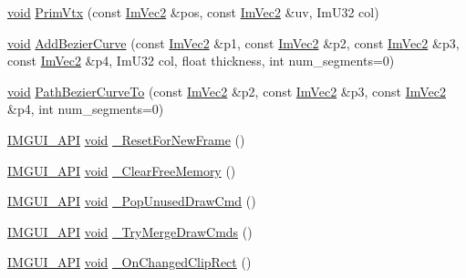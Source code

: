 \begin{DoxyCompactItemize}
\item 
\hyperlink{imgui__impl__opengl3__loader_8h_ac668e7cffd9e2e9cfee428b9b2f34fa7}{void} \hyperlink{structImDrawList_a405377158f0028ad8b4fb6509eef4532}{Prim\+Vtx} (const \hyperlink{structImVec2}{Im\+Vec2} \&pos, const \hyperlink{structImVec2}{Im\+Vec2} \&uv, Im\+U32 col)
\item 
\hyperlink{imgui__impl__opengl3__loader_8h_ac668e7cffd9e2e9cfee428b9b2f34fa7}{void} \hyperlink{structImDrawList_ab815c52f29fa5579bad8142ae2e89ced}{Add\+Bezier\+Curve} (const \hyperlink{structImVec2}{Im\+Vec2} \&p1, const \hyperlink{structImVec2}{Im\+Vec2} \&p2, const \hyperlink{structImVec2}{Im\+Vec2} \&p3, const \hyperlink{structImVec2}{Im\+Vec2} \&p4, Im\+U32 col, float thickness, int num\+\_\+segments=0)
\item 
\hyperlink{imgui__impl__opengl3__loader_8h_ac668e7cffd9e2e9cfee428b9b2f34fa7}{void} \hyperlink{structImDrawList_a9a9dc4a62a26718014e9dc67f40a19e3}{Path\+Bezier\+Curve\+To} (const \hyperlink{structImVec2}{Im\+Vec2} \&p2, const \hyperlink{structImVec2}{Im\+Vec2} \&p3, const \hyperlink{structImVec2}{Im\+Vec2} \&p4, int num\+\_\+segments=0)
\item 
\hyperlink{imgui_8h_a43829975e84e45d1149597467a14bbf5}{I\+M\+G\+U\+I\+\_\+\+A\+PI} \hyperlink{imgui__impl__opengl3__loader_8h_ac668e7cffd9e2e9cfee428b9b2f34fa7}{void} \hyperlink{structImDrawList_a5f78fe195b2507e5926560f591141ff3}{\+\_\+\+Reset\+For\+New\+Frame} ()
\item 
\hyperlink{imgui_8h_a43829975e84e45d1149597467a14bbf5}{I\+M\+G\+U\+I\+\_\+\+A\+PI} \hyperlink{imgui__impl__opengl3__loader_8h_ac668e7cffd9e2e9cfee428b9b2f34fa7}{void} \hyperlink{structImDrawList_a61a886a16655c810e04c0ccebb228f9a}{\+\_\+\+Clear\+Free\+Memory} ()
\item 
\hyperlink{imgui_8h_a43829975e84e45d1149597467a14bbf5}{I\+M\+G\+U\+I\+\_\+\+A\+PI} \hyperlink{imgui__impl__opengl3__loader_8h_ac668e7cffd9e2e9cfee428b9b2f34fa7}{void} \hyperlink{structImDrawList_a2cb0295fcd3062bfedbebbad55865455}{\+\_\+\+Pop\+Unused\+Draw\+Cmd} ()
\item 
\hyperlink{imgui_8h_a43829975e84e45d1149597467a14bbf5}{I\+M\+G\+U\+I\+\_\+\+A\+PI} \hyperlink{imgui__impl__opengl3__loader_8h_ac668e7cffd9e2e9cfee428b9b2f34fa7}{void} \hyperlink{structImDrawList_abdba85bbdc26a98eac56ed04683d5fc7}{\+\_\+\+Try\+Merge\+Draw\+Cmds} ()
\item 
\hyperlink{imgui_8h_a43829975e84e45d1149597467a14bbf5}{I\+M\+G\+U\+I\+\_\+\+A\+PI} \hyperlink{imgui__impl__opengl3__loader_8h_ac668e7cffd9e2e9cfee428b9b2f34fa7}{void} \hyperlink{structImDrawList_a8e51ddbe1f9732bc271ce807bec23f54}{\+\_\+\+On\+Changed\+Clip\+Rect} ()

\end{DoxyCompactItemize}
